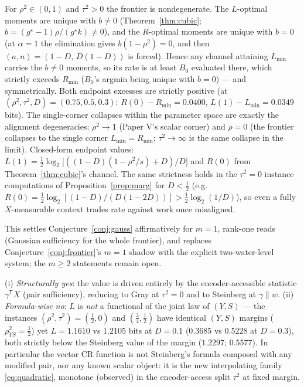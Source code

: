 \documentclass[11pt]{article}
\begin{document}
\begin{corollary}\label{cor:sep}
For $\rho^2\in(0,1)$ and $\tau^2>0$ the frontier is nondegenerate. The
$L$-optimal moments are unique with $b\ne0$ (Theorem~\ref{thm:cubic};
$b=(g^\star{-}1)\rho/(g^\star k)\ne0$), and the $R$-optimal moments are
unique with $b=0$ (at $\alpha=1$ the elimination gives $b(1-\rho^2)=0$,
and then $(a,n)=(1{-}D,\,D(1{-}D))$ is forced). Hence any channel
attaining $L_{\min}$ carries the $b\ne0$ moments, so its rate is at least
$B_0$ evaluated there, which strictly exceeds $R_{\min}$ ($B_0$'s argmin
being unique with $b=0$) --- and symmetrically. Both endpoint excesses
are strictly positive (at $(\rho^2,\tau^2,D)=(0.75,0.5,0.3)$:
$R(0)-R_{\min}=0.0400$, $L(1)-L_{\min}=0.0349$ bits). The single-corner
collapses within the parameter space are exactly the alignment
degeneracies: $\rho^2\to1$ (Paper V's scalar corner) and $\rho=0$ (the
frontier collapses to the single corner $L_{\min}=R_{\min}$; $\tau^2\to
\infty$ is the same collapse in the limit). Closed-form endpoint values:
$L(1)=\tfrac12\log_2\bigl[((1-D)(1-\rho^2/s)+D)/D\bigr]$ and $R(0)$ from
Theorem~\ref{thm:cubic}'s channel. The same strictness holds in the
$\tau^2=0$ instance computations of Proposition~\ref{prop:marg} for
$D<\tfrac12$
(e.g.\ $R(0)=\tfrac12\log_2[(1-D)/(D(1-2D))]>\tfrac12\log_2(1/D)$), so
even a fully $X$-measurable context trades rate against work once
misaligned.
\end{corollary}

This settles Conjecture~\ref{conj:gauss} affirmatively for $m=1$,
rank-one reads (Gaussian sufficiency for the whole frontier), and
replaces Conjecture~\ref{conj:frontier}'s $m=1$ shadow with the explicit
two-water-level system; the $m\ge2$ statements remain open.

\begin{corollary}\label{cor:kaspi}
(i) \emph{Structurally yes}: the value is driven entirely by the
encoder-accessible statistic $\gamma^{\mathsf T}X$ (pair sufficiency),
reducing to Gray at $\tau^2=0$ and to Steinberg at $\gamma\parallel w$.
(ii) \emph{Formula-wise no}: $L$ is \emph{not} a functional of the joint
law of $(Y,S)$ --- the instances $(\rho^2,\tau^2)=(\tfrac12,0)$ and
$(\tfrac34,\tfrac12)$ have identical $(Y,S)$ margins
($\rho_{YS}^2=\tfrac12$) yet $L=1.1610$ vs $1.2105$ bits at $D=0.1$
($0.3685$ vs $0.5228$ at $D=0.3$), both strictly below the
Steinberg value of the margin ($1.2297$; $0.5577$). In particular the
vector CR function is not Steinberg's formula composed with any modified
pair, nor any known scalar object: it is the new interpolating family
\eqref{eq:quadratic}, monotone (observed) in the encoder-access split
$\tau^2$ at fixed margin.
\end{corollary}
\end{document}
